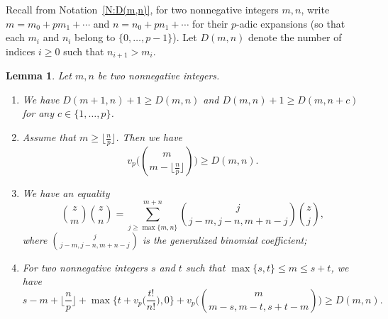 \documentclass[12pt]{amsart}
\newtheorem{lemma}[subsection]{Lemma}
\theoremstyle{definition}
\numberwithin{equation}{subsection}
\begin{document}
Recall from Notation~\ref{N:D(m,n)},  for two nonnegative integers $m,n$, write $m = m_0+pm_1+\cdots$ and $n = n_0+pn_1+\cdots $ for their $p$-adic expansions (so that each $m_i$ and $n_i$ belong to $\{0, \dots, p-1\}$).
Let $D(m,n)$ denote the number of indices $i\geq 0$ such that $n_{i+1} > m_i$.
\begin{lemma}
\label{L:elementary D}
Let $m,n$ be two nonnegative integers.
\begin{enumerate}
\item We have $D(m+1,n)+1 \geq D(m,n)$ and $D(m,n)+1 \geq D(m,n+c)$ for any $c\in \{1, \dots, p\}$.
\item Assume that $m \geq \lfloor \frac np \rfloor$. Then we have
		\[
		v_p\Big(\binom{m}{m-\lfloor \frac np \rfloor} \Big)\geq D(m,n).
		\]
		\item We have an equality
		$$
		\binom zm\binom zn =  \sum_{j \geq \max\{m,n\}}^{m+n}\binom{j}{j-m,j-n, m+n-j}\binom z{j},
		$$
		where $\binom{j}{j-m,j-n,m+n-j}$ is the generalized binomial coefficient;
		\item For two nonnegative integers $s$ and $t$ such that $\max\{s,t \}\leq m\leq s+t$, we have
		\begin{equation}\label{E:fine halo bound inequality}
		s-m + \Big\lfloor\frac np\Big\rfloor+\max \Big\{t+v_p \Big( \frac{t!}{n!}\Big), 0\Big\} +v_p \Big( \binom m{m-s, m-t, s+t-m} \Big) \geq D(m,n).
\end{equation}
	\end{enumerate}
\end{lemma}
\end{document}
